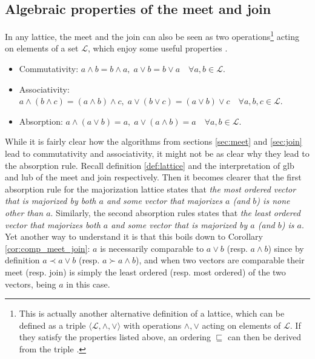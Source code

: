  
\subsection{Algebraic properties of the meet and join}

In any lattice, the meet and the join can also be seen as two operations\footnote{This is actually another alternative definition of a lattice, which can be defined as a triple $\langle \mathcal{L}, \wedge, \vee \rangle$ with operations $\wedge, \vee$ acting on elements of $\mathcal{L}$. If they satisfy the properties listed above, an ordering $\sqsubseteq$ can then be derived from the triple \cite[p. 47]{dominich_elements_2008}.}
acting on elements of a set $\mathcal{L}$, which enjoy some useful properties \cite[p. 46]{dominich_elements_2008}.

\begin{itemize} \label{it:meet_join_properties}
    \item Commutativity: $a \wedge b = b \wedge a, \; a \vee b = b \vee a \quad \forall a, b \in \mathcal{L}$.
    \item Associativity: $a \wedge (b \wedge c) = (a \wedge b) \wedge c, \;
                            a \vee (b \vee c) = (a \vee b) \vee c \quad \forall a, b, c \in \mathcal{L}$.
    \item Absorption: $a \wedge (a \vee b) = a, \; a \vee (a \wedge b) = a \quad \forall a, b \in \mathcal{L}$.
\end{itemize}

While it is fairly clear how the algorithms from sections \ref{sec:meet} and \ref{sec:join} lead to commutativity and associativity, it might not be as clear why they lead to the absorption rule. Recall definition \ref{def:lattice} and the interpretation of glb and lub of the meet and join respectively. Then it becomes clearer that the first absorption rule for the majorization lattice states that \textit{the most ordered vector that is majorized by both $a$ and some vector that majorizes $a$ (and $b$) is none other than $a$}. Similarly, the second absorption rules states that \textit{the least ordered vector that majorizes both $a$ and some vector that is majorized by $a$ (and $b$) is $a$}. Yet another way to understand it is that this boils down to Corollary \ref{cor:comp_meet_join}: $a$ is necessarily comparable to $a \vee b$ (resp. $a \wedge b$) since by definition $a \prec a \vee b$ (resp. $a \succ a \wedge b$), and when two vectors are comparable their meet (resp. join) is simply the least ordered (resp. most ordered) of the two vectors, being $a$ in this case.

